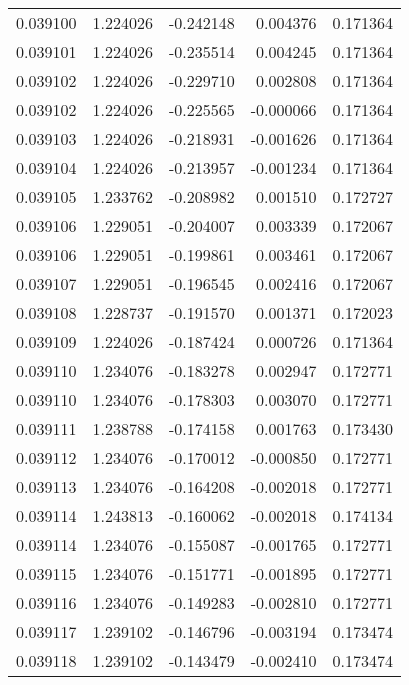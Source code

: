 \begin{tabular}{lrrrr}
0.039100    &  1.224026 & -0.242148 &  0.004376 &             0.171364 \\
0.039101    &  1.224026 & -0.235514 &  0.004245 &             0.171364 \\
0.039102    &  1.224026 & -0.229710 &  0.002808 &             0.171364 \\
0.039102    &  1.224026 & -0.225565 & -0.000066 &             0.171364 \\
0.039103    &  1.224026 & -0.218931 & -0.001626 &             0.171364 \\
0.039104    &  1.224026 & -0.213957 & -0.001234 &             0.171364 \\
0.039105    &  1.233762 & -0.208982 &  0.001510 &             0.172727 \\
0.039106    &  1.229051 & -0.204007 &  0.003339 &             0.172067 \\
0.039106    &  1.229051 & -0.199861 &  0.003461 &             0.172067 \\
0.039107    &  1.229051 & -0.196545 &  0.002416 &             0.172067 \\
0.039108    &  1.228737 & -0.191570 &  0.001371 &             0.172023 \\
0.039109    &  1.224026 & -0.187424 &  0.000726 &             0.171364 \\
0.039110    &  1.234076 & -0.183278 &  0.002947 &             0.172771 \\
0.039110    &  1.234076 & -0.178303 &  0.003070 &             0.172771 \\
0.039111    &  1.238788 & -0.174158 &  0.001763 &             0.173430 \\
0.039112    &  1.234076 & -0.170012 & -0.000850 &             0.172771 \\
0.039113    &  1.234076 & -0.164208 & -0.002018 &             0.172771 \\
0.039114    &  1.243813 & -0.160062 & -0.002018 &             0.174134 \\
0.039114    &  1.234076 & -0.155087 & -0.001765 &             0.172771 \\
0.039115    &  1.234076 & -0.151771 & -0.001895 &             0.172771 \\
0.039116    &  1.234076 & -0.149283 & -0.002810 &             0.172771 \\
0.039117    &  1.239102 & -0.146796 & -0.003194 &             0.173474 \\
0.039118    &  1.239102 & -0.143479 & -0.002410 &             0.173474 \\

\end{tabular}
